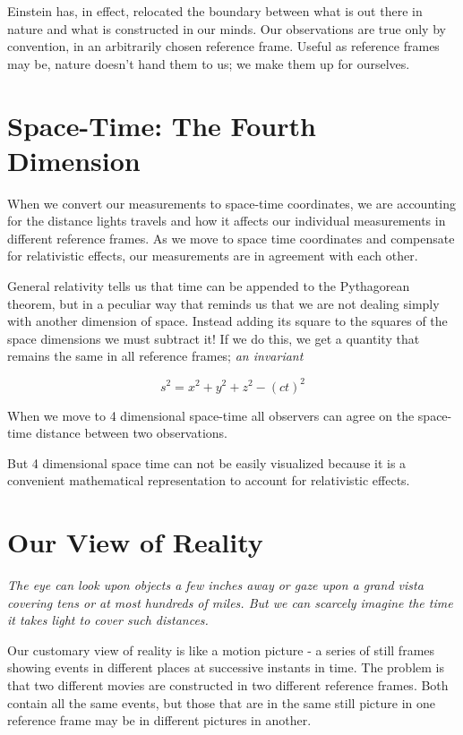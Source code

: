 \documentclass[12pt, letterpaper]{article}
\begin{document}
    Einstein has, in effect, relocated the boundary between what is out there 
    in nature and what is constructed in our minds. Our observations are true 
    only by convention, in an arbitrarily chosen reference frame. Useful as 
    reference frames may be, nature doesn't hand them to us; we make them 
    up for ourselves.

    \section{Space-Time: The Fourth Dimension}
    
    When we convert our measurements to space-time coordinates, we are 
    accounting for the distance lights travels and how it affects our 
    individual measurements in different reference frames. As we move to 
    space time coordinates and compensate for relativistic effects, our 
    measurements are in agreement with each other.
    
    General relativity tells us that time can be appended to the Pythagorean 
    theorem, but in a peculiar way that reminds us that we are not dealing 
    simply with another dimension of space. Instead adding its square to 
    the squares of the space dimensions we must subtract it! If we do this, 
    we get a quantity that remains the same in all reference frames; 
    \textit{an invariant} 
    
    $$s^2=x^2 + y^2 + z^2 - (ct)^2$$

    When we move to 4 dimensional space-time all observers can agree on the 
    space-time distance between two observations.
    
    But 4 dimensional space time can not be easily visualized because it is 
    a convenient mathematical representation to account for relativistic 
    effects. 

    \section{Our View of Reality}    
    \textit{The eye can look upon objects a few inches away or gaze upon a grand 
    vista covering tens or at most hundreds of miles. But we can scarcely 
    imagine the time it takes light to cover such distances.}
    
    Our customary view of reality is like a motion picture - a series of 
    still frames showing events in different places at successive instants 
    in time. The problem is that two different movies are constructed 
    in two different reference frames. Both contain all the same events, 
    but those that are in the same still picture in one reference frame may 
    be in different pictures in another.
    
\end{document}
